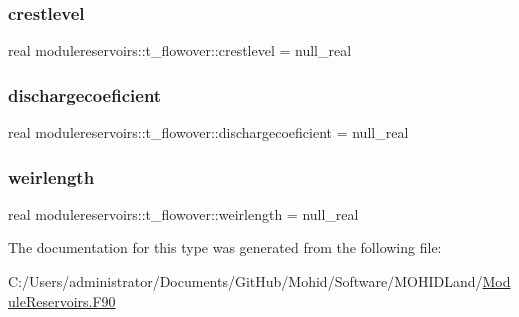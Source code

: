 \subsubsection{\texorpdfstring{crestlevel}{crestlevel}}
{\footnotesize\ttfamily real modulereservoirs\+::t\+\_\+flowover\+::crestlevel = null\+\_\+real\hspace{0.3cm}{\ttfamily [private]}}

\mbox{\label{structmodulereservoirs_1_1t__flowover_ad583ba7aeb7ee351d5ae4e0e1bd1e001}} 
\subsubsection{\texorpdfstring{dischargecoeficient}{dischargecoeficient}}
{\footnotesize\ttfamily real modulereservoirs\+::t\+\_\+flowover\+::dischargecoeficient = null\+\_\+real\hspace{0.3cm}{\ttfamily [private]}}

\mbox{\label{structmodulereservoirs_1_1t__flowover_a05d7947991a94084b3738b99f29d4e9f}} 
\subsubsection{\texorpdfstring{weirlength}{weirlength}}
{\footnotesize\ttfamily real modulereservoirs\+::t\+\_\+flowover\+::weirlength = null\+\_\+real\hspace{0.3cm}{\ttfamily [private]}}



The documentation for this type was generated from the following file\+:\begin{DoxyCompactItemize}
\item 
C\+:/\+Users/administrator/\+Documents/\+Git\+Hub/\+Mohid/\+Software/\+M\+O\+H\+I\+D\+Land/\mbox{\hyperlink{_module_reservoirs_8_f90}{Module\+Reservoirs.\+F90}}\end{DoxyCompactItemize}
